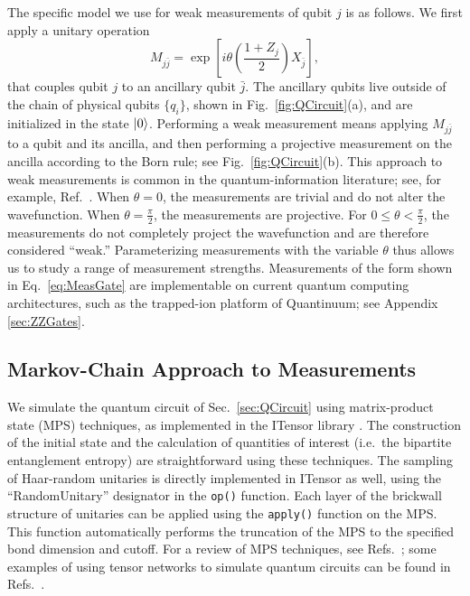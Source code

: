 \documentclass[reprint,amsmath,amssymb,aps, twocolumn, superscriptaddress, prb]{revtex4-2}
\begin{document}
The specific model we use for weak measurements of qubit $j$ is as follows. We first apply a unitary operation 
%
\begin{equation}
    M_{j\bar{j}} = \exp\left[i\theta \left( \frac{1+Z_j}{2} \right) X_{\bar{j}}\right], \label{eq:MeasGate}
\end{equation}
%
that couples qubit $j$ to an ancillary qubit $\bar j$. The ancillary qubits live outside of the chain of physical qubits $\{q_i\}$, shown in Fig.~\ref{fig:QCircuit}(a), and are initialized in the state $\ket{0}$. Performing a weak measurement means applying $M_{j\bar{j}}$ to a qubit and its ancilla, and then performing a projective measurement on the ancilla according to the Born rule; see Fig.~\ref{fig:QCircuit}(b). This approach to weak measurements is common in the quantum-information literature; see, for example, Ref.~\cite{BaoPRB2020}. When $\theta = 0$, the measurements are trivial and do not alter the wavefunction. When $\theta= \frac{\pi}{2}$, the measurements are projective. For $0 \leq \theta < \frac{\pi}{2}$, the measurements do not completely project the wavefunction and are therefore considered ``weak.'' Parameterizing measurements with the variable $\theta$ thus allows us to study a range of measurement strengths. Measurements of the form shown in Eq.~\eqref{eq:MeasGate} are implementable on current quantum computing architectures, such as the trapped-ion platform of Quantinuum; see Appendix \ref{sec:ZZGates}.  

\subsection{Markov-Chain Approach to Measurements}
\label{sec:MarkovChain}

We simulate the quantum circuit of Sec.~\ref{sec:QCircuit} using matrix-product state (MPS) techniques, as implemented in the ITensor library \cite{ITensor,ITensor-r0.3}. The construction of the initial state and the calculation of quantities of interest (i.e.~the bipartite entanglement entropy) are straightforward using these techniques. The sampling of Haar-random unitaries is directly implemented in ITensor as well, using the ``RandomUnitary'' designator in the \texttt{op()} function. Each layer of the brickwall structure of unitaries can be applied using the \texttt{apply()} function on the MPS. This function automatically performs the truncation of the MPS to the specified bond dimension and cutoff. For a review of MPS techniques, see Refs.~\cite{SchollwockRMP2005,SchollwockAnnPhys2011,CiracRMP2021}; some examples of using tensor networks to simulate quantum circuits can be found in Refs.~\cite{MelkoPRA2021, HaghshenasPRX2022,SeitzQuantum2023, BerezutskiiArxiv2025}. 
\end{document}
